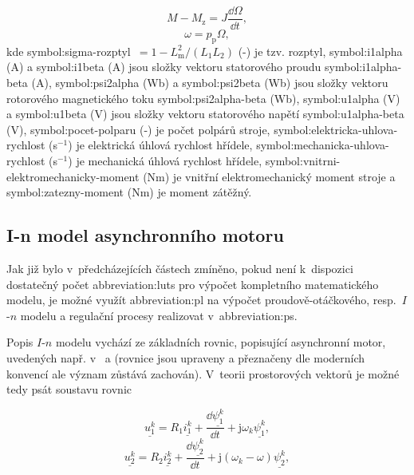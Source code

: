\documentclass[a4paper, twoside, 11pt]{article}
\begin{document}
\begin{equation}
    M - M_\text{z} = J \frac{\dd{\Omega}}{\dd{t}},
\end{equation}
\begin{equation}
    \omega = p_\text{p} \Omega,
\end{equation}
kde \gls{symbol:sigma-rozptyl}~$= 1 - L_\text{m}^{2}/(L_1 L_2)$ (-) je tzv. rozptyl, \gls{symbol:i1alpha} (A) a \gls{symbol:i1beta} (A) jsou složky vektoru statorového proudu \gls{symbol:i1alpha-beta} (A), \gls{symbol:psi2alpha} (Wb) a \gls{symbol:psi2beta} (Wb) jsou složky vektoru rotorového magnetického toku \gls{symbol:psi2alpha-beta} (Wb), \gls{symbol:u1alpha} (V) a \gls{symbol:u1beta} (V) jsou složky vektoru statorového napětí \gls{symbol:u1alpha-beta} (V), \gls{symbol:pocet-polparu} (-) je počet polpárů stroje, \gls{symbol:elektricka-uhlova-rychlost} (s$^{-1}$) je elektrická úhlová rychlost hřídele, \gls{symbol:mechanicka-uhlova-rychlost} (s$^{-1}$) je mechanická úhlová rychlost hřídele, \gls{symbol:vnitrni-elektromechanicky-moment} (Nm) je vnitřní elektromechanický moment stroje a \gls{symbol:zatezny-moment} (Nm) je moment zátěžný. \cite{lipcak-bauer-ept-moodle}

	\subsection{I-n model asynchronního motoru}
		Jak již bylo v~předcházejících částech zmíněno, pokud není k~dispozici dostatečný počet \gls{abbreviation:luts} pro výpočet kompletního matematického modelu, je možné využít \gls{abbreviation:pl} na výpočet proudově-otáčkového, resp.~$I$-$n$ modelu a regulační procesy realizovat v~\gls{abbreviation:ps}.\par
		Popis $I$-$n$ modelu vychází ze základních rovnic, popisující asynchronní motor, uvedených např. v~\cite{kobrle-elektricke-pohony} a \cite{lipcak-bauer-ept-moodle} (rovnice jsou upraveny a přeznačeny dle moderních konvencí ale význam zůstává zachován). V~teorii prostorových vektorů je možné tedy psát soustavu rovnic

		\begin{equation}
			\underline{u_{1}^{k}} = R_1 \underline{i_{1}^{k}} + \frac{\dd{\underline{\psi_1^{k}}}}{\dd{t}} + \text{j} \omega_k \underline{\psi_1^{k}},
		\end{equation}
		\begin{equation}
			\underline{u_{2}^{k}} = R_2 \underline{i_{2}^{k}} + \frac{\dd{\underline{\psi_2^{k}}}}{\dd{t}} + \text{j} (\omega_k - \omega) \underline{\psi_2^{k}},
		\end{equation}
	
\end{document}
